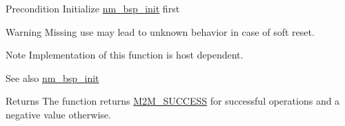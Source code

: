 \begin{DoxyPrecond}{Precondition}
Initialize \hyperlink{group__NmBspInitFn_ga91533a50cf3da832110a746b4a57789e}{nm\+\_\+bsp\+\_\+init} first 
\end{DoxyPrecond}
\begin{DoxyWarning}{Warning}
Missing use may lead to unknown behavior in case of soft reset. 
\end{DoxyWarning}
\begin{DoxyNote}{Note}
Implementation of this function is host dependent. 
\end{DoxyNote}
\begin{DoxySeeAlso}{See also}
\hyperlink{group__NmBspInitFn_ga91533a50cf3da832110a746b4a57789e}{nm\+\_\+bsp\+\_\+init} 
\end{DoxySeeAlso}
\begin{DoxyReturn}{Returns}
The function returns \hyperlink{nm__common_8h_a9ef27ba27aafdd1aa3a79d3ba2c36b8f}{M2\+M\+\_\+\+S\+U\+C\+C\+E\+SS} for successful operations and a negative value otherwise. 
\end{DoxyReturn}
